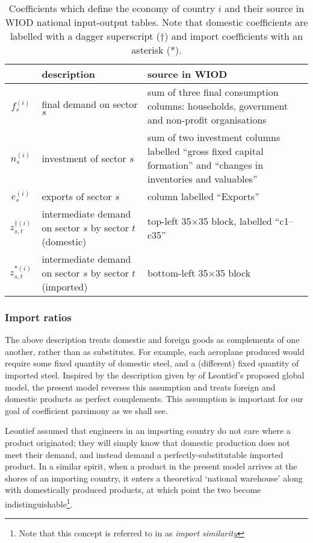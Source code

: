 \documentclass{article}
\begin{document}
\begin{table}
    \centering
    \caption{Coefficients which define the economy of country $i$ and their source in WIOD national input-output tables. Note that domestic coefficients are labelled with a dagger superscript ($\dagger$) and import coefficients with an asterisk (*).}\label{tbl:cvars}
    \begin{tabular}{cp{3.7cm}p{6.5cm}}
        \toprule
        & description  & source in WIOD \\ \midrule
        $f_s^{(i)}$ & final demand on sector $s$  & sum of three final consumption columns:
        households, government and non-profit organisations \\
        $n_s^{(i)}$ & investment of sector $s$ & sum of two investment columns labelled
        ``gross fixed capital formation'' and
        ``changes in inventories and valuables'' \\
        $e_s^{(i)}$ & exports of sector $s$ & column labelled ``Exports'' \\
        $z_{s,t}^{\dagger(i)}$ & intermediate demand on 
        sector $s$ by sector $t$ \mbox{(domestic)}& top-left 35$\times$35 block, labelled ``c1--c35'' \\
        $z_{s,t}^{*(i)}$ & intermediate demand on 
        sector $s$ by sector $t$ \mbox{(imported)}& bottom-left 35$\times$35 block
        \\\bottomrule
    \end{tabular}
\end{table}

\subsubsection*{Import ratios}\label{sec:importratios}

The above description treats domestic and foreign goods as complements of one another, rather than as substitutes.
For example, each aeroplane produced would require some fixed quantity of domestic steel, and a (different) fixed quantity of imported steel.
Inspired by the description given by \textcite{duchin_international_2004} of Leontief's proposed global model, the present model reverses this assumption and treats foreign and domestic products as perfect complements.
This assumption is important for our goal of coefficient parsimony as we shall see.

Leontief assumed that engineers in an importing country do not care where a product originated; they will simply know that domestic production does not meet their demand, and instead demand a perfectly-substitutable imported product.
In a similar spirit, when a product in the present model arrives at the shores of an importing country, it enters a theoretical `national warehouse' along with domestically produced products, at which point the two become indistinguishable\footnote{Note that this concept is referred to in \textcite{miller_input-output_1985} as \textit{import similarity}}.
\end{document}
